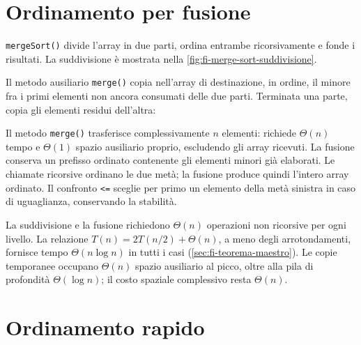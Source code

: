 \clearpage

\section{Ordinamento per fusione}
\label{sec:fi-java-alg-fusione}

\texttt{mergeSort()} divide l'array in due parti, ordina entrambe
ricorsivamente e fonde i risultati. La suddivisione è mostrata
nella \cref{fig:fi-merge-sort-suddivisione}.

\noindent
\begin{minipage}{\linewidth}

\end{minipage}

Il metodo ausiliario \texttt{merge()} copia nell'array di
destinazione, in ordine, il minore fra i primi elementi non ancora
consumati delle due parti. Terminata una parte, copia gli
elementi residui dell'altra:

\noindent
\begin{minipage}{\linewidth}

\end{minipage}

Il metodo \texttt{merge()} trasferisce complessivamente \(n\) elementi:
richiede \(\Theta(n)\) tempo e \(\Theta(1)\) spazio ausiliario
proprio, escludendo gli array ricevuti.
La fusione conserva un prefisso ordinato contenente gli elementi
minori già elaborati. Le chiamate ricorsive ordinano le due metà;
la fusione produce quindi l'intero array ordinato. Il confronto
\lstinline|<=| sceglie per primo un elemento della metà sinistra
in caso di uguaglianza, conservando la stabilità.

La suddivisione e la fusione richiedono \(\Theta(n)\) operazioni
non ricorsive per ogni livello. La relazione
\(T(n)=2T(n/2)+\Theta(n)\), a meno degli arrotondamenti,
fornisce tempo \(\Theta(n\log n)\) in tutti i casi
(\cref{sec:fi-teorema-maestro}). Le copie temporanee occupano
\(\Theta(n)\) spazio ausiliario al picco, oltre alla pila di
profondità \(\Theta(\log n)\); il costo spaziale complessivo
resta \(\Theta(n)\).

\clearpage

\section{Ordinamento rapido}
\label{sec:fi-java-alg-rapido}

